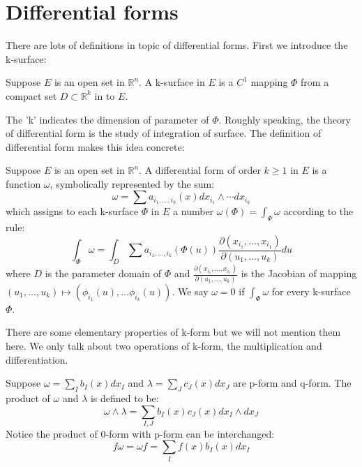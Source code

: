 \section{Differential forms}
There are lots of definitions in topic of differential forms. First we introduce the k-surface:
\begin{definition}
    Suppose $E$ is an open set in $\mathbb{R}^n$. A k-surface in $E$ is a $C^1$ mapping $\Phi$ from a compact set $D\subset \mathbb{R}^k$ in to $E$.
\end{definition}
The 'k' indicates the dimension of parameter of $\Phi$. Roughly speaking, the theory of differential form is the study of integration of surface. The definition of differential form makes this idea concrete:
\begin{definition}
    Suppose $E$ is an open set in $\mathbb{R}^n$. A differential form of order $k\geq 1$ in $E$ is a function $\omega$, symbolically represented by the sum:
    \begin{equation*}
        \omega=\sum a_{i_1,\dots,i_k}(x)dx_{i_1}\wedge\cdots dx_{i_k}
    \end{equation*}
    which assigns to each k-surface $\Phi$ in $E$ a number $\omega(\Phi)=\int_{\Phi}{\omega}$ according to the rule:
    \begin{equation*}
        \int_{\Phi}{\omega}=\int_{D}{\sum a_{i_1,\dots,i_k}(\Phi(u))\frac{\partial(x_{i_1},\dots,x_{i_1})}{\partial(u_{1},\dots,u_{k})}du}
    \end{equation*}
    where $D$ is the parameter domain of $\Phi$ and $\frac{\partial(x_{i_1},\dots,x_{i_1})}{\partial(u_{1},\dots,u_{k})}$ is the Jacobian of mapping $(u_1,\dots,u_k)\mapsto (\phi_{i_1}(u),\dots\phi_{i_k}(u))$. We say $\omega=0$ if $\int_{\Phi}{\omega}$ for every k-surface $\Phi$.
\end{definition}
There are some elementary properties of k-form but we will not mention them here. We only talk about two operations of  k-form, the multiplication and differentiation.\par
Suppose $\omega=\sum_I b_I(x)dx_I$ and $\lambda=\sum_J c_J(x)dx_J$ are p-form and q-form. The product of $\omega$ and $\lambda$ is defined to be:
\begin{equation*}
    \omega\wedge\lambda=\sum_{I,J}b_I(x)c_J(x)d{x_I}\wedge dx_J
\end{equation*}
Notice the product of 0-form with p-form can be interchanged:
\begin{equation*}
    f\omega=\omega f=\sum_If(x)b_I(x)dx_I
\end{equation*}
